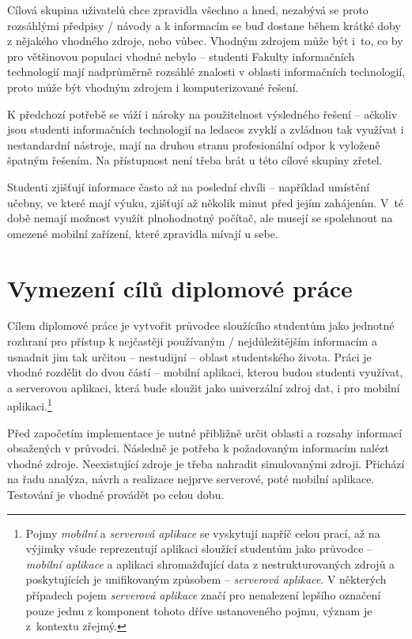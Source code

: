 Cílová skupina uživatelů chce zpravidla všechno a hned, nezabývá se proto rozsáhlými předpisy / návody a k informacím se buď dostane během krátké doby z nějakého vhodného zdroje, nebo vůbec. Vhodným zdrojem může být i~to, co by pro většinovou populaci vhodné nebylo -- studenti Fakulty informačních technologií mají nadprůměrně rozsáhlé znalosti v oblasti informačních technologií, proto může být vhodným zdrojem i komputerizované řešení.

K předchozí potřebě se váží i nároky na použitelnost výsledného řešení -- ačkoliv jsou studenti informačních technologií na ledacos zvyklí a zvládnou tak využívat i nestandardní nástroje, mají na druhou stranu profesionální odpor k vyloženě špatným řešením. Na přístupnost není třeba brát u této cílové skupiny zřetel. 

Studenti zjišťují informace často až na poslední chvíli -- například umístění učebny, ve které mají výuku, zjišťují až několik minut před jejím zahájením. V~té době nemají možnost využít plnohodnotný počítač, ale musejí se spolehnout na omezené mobilní zařízení, které zpravidla mívají u sebe.

\section{Vymezení cílů diplomové práce}
Cílem diplomové práce je vytvořit průvodce sloužícího studentům jako jednotné rozhraní pro přístup k nejčastěji používaným / nejdůležitějším informacím a usnadnit jim tak určitou -- nestudijní -- oblast studentského života. Práci je vhodné rozdělit do dvou částí -- mobilní aplikaci, kterou budou studenti využívat, a serverovou aplikaci, která bude sloužit jako univerzální zdroj dat, i pro mobilní aplikaci.\footnote{\label{fnt:aplikace} Pojmy \textit{mobilní} a \textit{serverová aplikace} se vyskytují napříč celou prací, až na výjimky všude reprezentují aplikaci sloužící studentům jako průvodce -- \textit{mobilní aplikace} a aplikaci shromažďující data z nestrukturovaných zdrojů a poskytujících je unifikovaným způsobem -- \textit{serverová aplikace}. V některých případech pojem \textit{serverová aplikace} značí pro nenalezení lepšího označení pouze jednu z komponent tohoto dříve ustanoveného pojmu, význam je z~kontextu zřejmý.}

Před započetím implementace je nutné přibližně určit oblasti a rozsahy informací obsažených v průvodci. Následně je potřeba k požadovaným informacím nalézt vhodné zdroje. Neexistující zdroje je třeba nahradit simulovanými zdroji. Přichází na řadu analýza, návrh a realizace nejprve serverové, poté mobilní aplikace. Testování je vhodné provádět po celou dobu.


